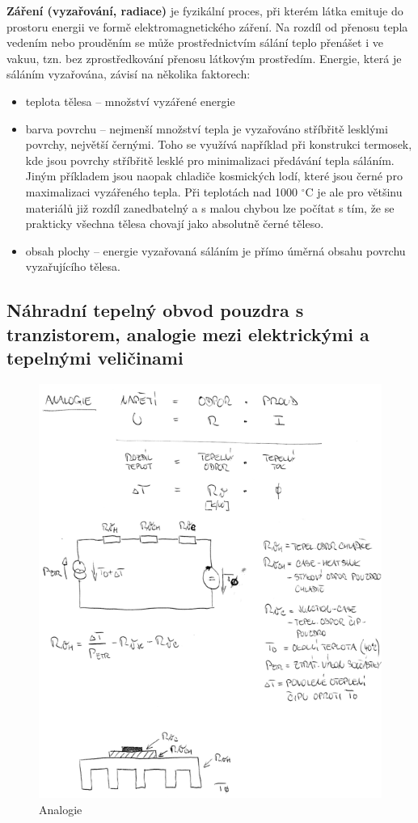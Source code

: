 \textbf{Záření (vyzařování, radiace)} je fyzikální proces, při kterém látka emituje do prostoru energii ve formě elektromagnetického záření. Na rozdíl od přenosu tepla vedením nebo prouděním se může prostřednictvím sálání teplo přenášet i ve vakuu, tzn. bez zprostředkování přenosu látkovým prostředím.
Energie, která je sáláním vyzařována, závisí na několika faktorech:
\begin{itemize}
\item teplota tělesa – množství vyzářené energie
\item barva povrchu – nejmenší množství tepla je vyzařováno stříbřitě lesklými povrchy, největší černými. Toho se využívá například při konstrukci termosek, kde jsou povrchy stříbřitě lesklé pro minimalizaci předávání tepla sáláním. Jiným příkladem jsou naopak chladiče kosmických lodí, které jsou černé pro maximalizaci vyzářeného tepla. Při teplotách nad 1000 $^{\circ}$C je ale pro většinu materiálů již rozdíl zanedbatelný a s malou chybou lze počítat s tím, že se prakticky všechna tělesa chovají jako absolutně černé těleso.
\item obsah plochy – energie vyzařovaná sáláním je přímo úměrná obsahu povrchu vyzařujícího tělesa.
\end{itemize}

\subsection{Náhradní tepelný obvod pouzdra s tranzistorem, analogie mezi elektrickými a tepelnými veličinami}

\begin{figure}[h]
   \begin{center}
     \includegraphics[scale=0.6]{images/Analogie.png}
   \end{center}
   \caption{Analogie}
\end{figure}